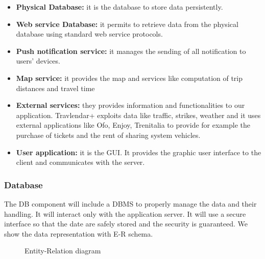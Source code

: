 \documentclass[12pt,titlepage]{article}
\begin{document}
\begin{flushleft}
\begin{itemize}
\item \textbf{Physical Database:} it is the database to store data persistently.
\item \textbf{Web service Database:} it permits to retrieve data from the physical database using standard web service protocols.
\item \textbf{Push notification service:} it manages the sending of all notification to users' devices.
\item \textbf{Map service:} it provides the map and services like computation of trip distances and travel time
\item \textbf{External services:} they provides information and functionalities to our application. Travlendar+ exploits data like traffic, strikes, weather and it uses external applications like Ofo, Enjoy, Trenitalia to provide for example the purchase of tickets and the rent of sharing system vehicles.
\item \textbf{User application: } it is the GUI. It provides the graphic user interface to the client and communicates with the server.
\end{itemize}
\end{flushleft}

\clearpage
\newpage

\begin{landscape}
\subsubsection{Database}
The DB component will include a DBMS to properly manage the data and their handling. It will interact only with the application server. It will use a secure interface so that the date are safely stored and the security is guaranteed.
We show the data representation with  E-R schema.
\begin{figure}[H]
\centering
\makebox[\textwidth]{\texttt{[image: "ER "]}}
\caption{Entity-Relation diagram}
\end{figure}
\end{landscape}
\clearpage
\newpage
\end{document}
